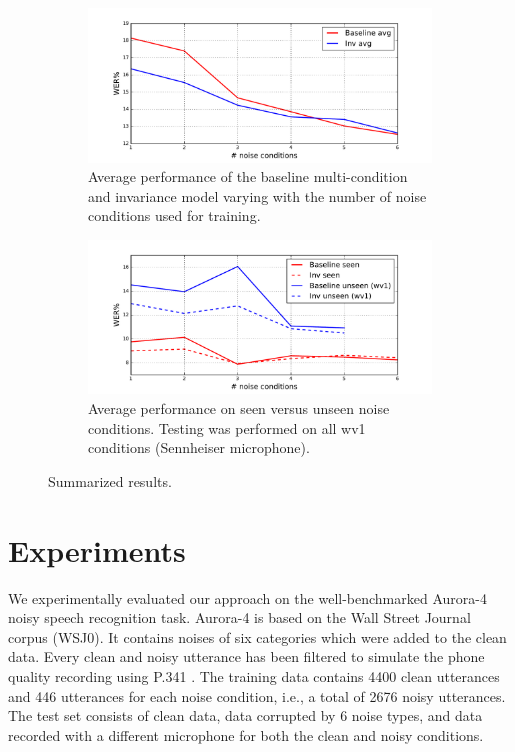 \documentclass[a4paper]{article}
\begin{document}
\begin{figure}[t]
    \begin{subfigure}[b]{\linewidth}
        \centering
        \includegraphics[width=1.1\linewidth]{wer_avg.pdf}
        \caption{Average performance of the baseline multi-condition and invariance model varying with  the number of noise
            conditions used for training.}
        \label{fig:results}
    \end{subfigure}
    \begin{subfigure}[b]{\linewidth}
        \centering
        \includegraphics[width=1.1\linewidth]{wer_seen_unseen.pdf}
        \caption{Average performance on seen versus unseen noise conditions.
            Testing was performed on all wv1 conditions (Sennheiser microphone).
            }
    \end{subfigure}
    \caption{Summarized results.}
    \label{fig:results}
\end{figure}

\section{Experiments}
\label{sec:experiments}
We experimentally evaluated our approach   
on the well-benchmarked Aurora-4 \citep{parihar2002aurora} noisy speech recognition task. Aurora-4
is based on the Wall Street Journal corpus (WSJ0). It contains noises of 
six categories which were added to the clean data. Every clean and noisy
utterance has been 
filtered to simulate the phone quality recording using P.341 \citep{pariharsignal}. The training
data contains 4400 clean utterances and 446 utterances for each noise condition,
i.e., a total of 2676 noisy utterances.
The test set consists of clean data, data corrupted by 6 noise types, and data 
recorded with a different microphone for both the clean and noisy conditions.
\end{document}

